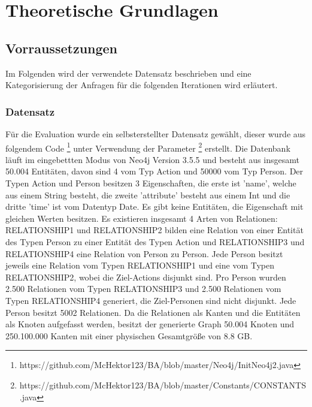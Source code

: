 
\chapter{Theoretische Grundlagen} %

\label{Kaptiel3} %

\section{Vorraussetzungen}
Im Folgenden wird der verwendete Datensatz beschrieben und eine Kategorisierung der Anfragen für die folgenden Iterationen wird erläutert. 
\subsection{Datensatz}
Für die Evaluation wurde ein selbsterstellter Datensatz gewählt, dieser wurde aus folgendem Code  \footnote{https://github.com/McHektor123/BA/blob/master/Neo4j/InitNeo4j2.java} unter Verwendung der Parameter \footnote{https://github.com/McHektor123/BA/blob/master/Constants/CONSTANTS.java} erstellt. Die Datenbank läuft im eingebettten Modus von Neo4j Version 3.5.5 und besteht aus insgesamt 50.004 Entitäten, davon sind 4  vom Typ Action und  50000  vom Typ Person. Der Typen Action und Person besitzen 3 Eigenschaften, die erste ist 'name', welche aus einem String besteht, die zweite 'attribute' besteht aus einem Int und die dritte 'time' ist vom Datentyp Date. Es gibt keine Entitäten, die Eigenschaft mit gleichen Werten besitzen. \newline
Es existieren insgesamt 4 Arten von Relationen: RELATIONSHIP1 und RELATIONSHIP2 bilden eine Relation von einer Entität des Typen Person zu einer Entität des Typen Action  und  RELATIONSHIP3 und RELATIONSHIP4 eine Relation von Person zu Person. Jede Person besitzt jeweils eine Relation vom Typen RELATIONSHIP1 und eine vom Typen RELATIONSHIP2, wobei die Ziel-Actions disjunkt sind. Pro Person wurden 2.500 Relationen vom Typen RELATIONSHIP3 und 2.500 Relationen vom Typen RELATIONSHIP4 generiert, die Ziel-Personen sind nicht disjunkt. Jede Person besitzt 5002 Relationen. Da die Relationen als Kanten und die Entitäten als Knoten aufgefasst werden, besitzt der generierte Graph 50.004 Knoten und 250.100.000 Kanten mit einer physischen Gesamtgröße von 8.8 GB. 
